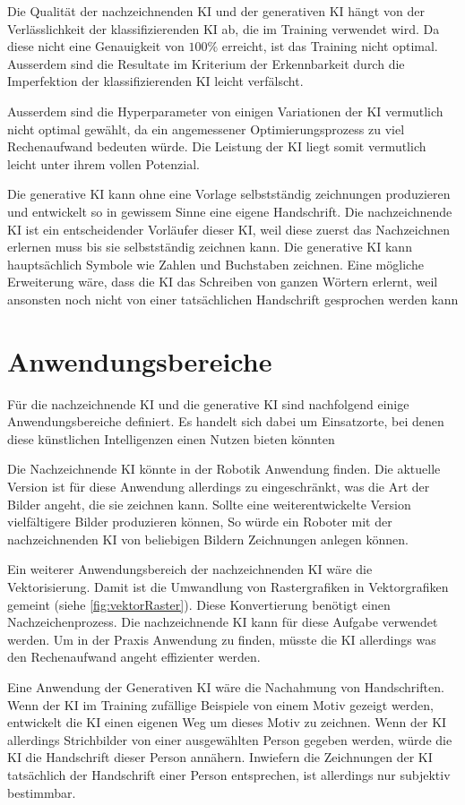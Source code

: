 Die Qualität der nachzeichnenden KI und der generativen KI hängt von der
Verlässlichkeit der klassifizierenden KI ab, die im Training verwendet wird. Da
diese nicht eine Genauigkeit von $100\%$ erreicht, ist das Training nicht
optimal. Ausserdem sind die Resultate im Kriterium der Erkennbarkeit durch die
Imperfektion der klassifizierenden KI leicht verfälscht.

Ausserdem sind die Hyperparameter von einigen Variationen der KI vermutlich
nicht optimal gewählt, da ein angemessener Optimierungsprozess zu viel
Rechenaufwand bedeuten würde. Die Leistung der KI liegt somit vermutlich leicht
unter ihrem vollen Potenzial.

Die generative KI kann ohne eine Vorlage selbstständig zeichnungen produzieren
und entwickelt so in gewissem Sinne eine eigene Handschrift. Die nachzeichnende
KI ist ein entscheidender Vorläufer dieser KI, weil diese zuerst das
Nachzeichnen erlernen muss bis sie selbstständig zeichnen kann. Die generative
KI kann hauptsächlich Symbole wie Zahlen und Buchstaben zeichnen. Eine mögliche
Erweiterung wäre, dass die KI das Schreiben von ganzen Wörtern erlernt, weil
ansonsten noch nicht von einer tatsächlichen Handschrift gesprochen werden kann

\section{Anwendungsbereiche}\label{chap:d_anwendung} Für die nachzeichnende KI
und die generative KI sind nachfolgend einige Anwendungsbereiche definiert. Es
handelt sich dabei um Einsatzorte, bei denen diese künstlichen Intelligenzen
einen Nutzen bieten könnten

Die Nachzeichnende KI könnte in der Robotik Anwendung finden. Die aktuelle
Version ist für diese Anwendung allerdings zu eingeschränkt, was die Art der
Bilder angeht, die sie zeichnen kann. Sollte eine weiterentwickelte Version
vielfältigere Bilder produzieren können, So würde ein Roboter mit der
nachzeichnenden KI von beliebigen Bildern Zeichnungen anlegen können.

Ein weiterer Anwendungsbereich der nachzeichnenden KI wäre die Vektorisierung.
Damit ist die Umwandlung von Rastergrafiken in Vektorgrafiken gemeint (siehe
\autoref{fig:vektorRaster}). Diese Konvertierung benötigt einen
Nachzeichenprozess. Die nachzeichnende KI kann für diese Aufgabe verwendet
werden. Um in der Praxis Anwendung zu finden, müsste die KI allerdings was den
Rechenaufwand angeht effizienter werden.

\label{fig:vektorRaster}

Eine Anwendung der Generativen KI wäre die Nachahmung von Handschriften. Wenn
der KI im Training zufällige Beispiele von einem Motiv gezeigt werden,
entwickelt die KI einen eigenen Weg um dieses Motiv zu zeichnen. Wenn der KI
allerdings Strichbilder von einer ausgewählten Person gegeben werden, würde die
KI die Handschrift dieser Person annähern. Inwiefern die Zeichnungen der KI
tatsächlich der Handschrift einer Person entsprechen, ist allerdings nur
subjektiv bestimmbar.
